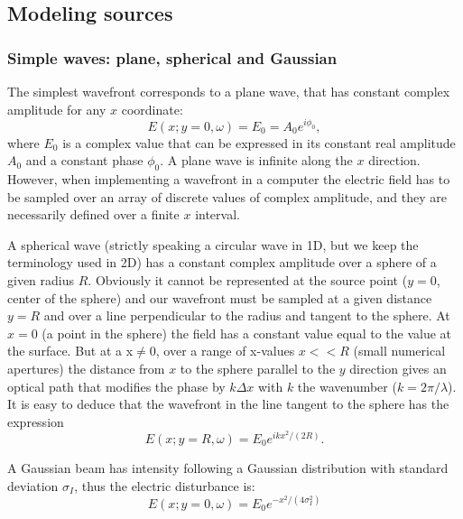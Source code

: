 \documentclass{iucr}              %
\begin{document}
\subsection{Modeling sources}
\label{sec:sources}

\subsubsection{Simple waves: plane, spherical and Gaussian}

The simplest wavefront corresponds to a plane wave, that has constant complex amplitude for any $x$ coordinate: 
\begin{equation}
   E(x;y=0,\omega)=E_0=A_0 e^{i \phi_0},
\end{equation}
where $E_0$ is a complex value that can be expressed in its constant real  amplitude $A_0$ and a constant phase $\phi_0$. A plane wave is infinite along the $x$ direction. However, when implementing a wavefront in a computer the electric field has to be sampled over an array of discrete values of complex amplitude, and they are necessarily defined over a finite $x$ interval. 

A spherical wave (strictly speaking a circular wave in 1D, but we keep the terminology used in 2D) has a constant complex amplitude over a sphere of a given radius $R$. Obviously it cannot be represented at the source point ($y=0$, center of the sphere) and our wavefront must be sampled at a given distance $y=R$ and over a line perpendicular to the radius and tangent to the sphere. At $x=0$ (a point in the sphere) the field has a constant value equal to the value at the surface. But at a x$\ne$0, over a range of x-values $x<<R$ (small numerical apertures) the distance from $x$ to the sphere parallel to the $y$ direction gives an optical path that modifies the phase by $k \Delta x$ with $k$ the wavenumber ($k = 2 \pi / \lambda$). It is easy to deduce that the wavefront in the line tangent to the sphere has the expression
\begin{equation}
\label{eq:sphericalWave}
    E(x;y=R,\omega)  = E_0 e^{i k x^2 / (2 R)}.
\end{equation}



A Gaussian beam has intensity following a Gaussian distribution with standard deviation $\sigma_I$, thus the electric disturbance is: 
\begin{equation}
    E(x;y=0,\omega) = E_0 e^{-x^2 / (4 \sigma_I^2)}
\end{equation}
\end{document}

